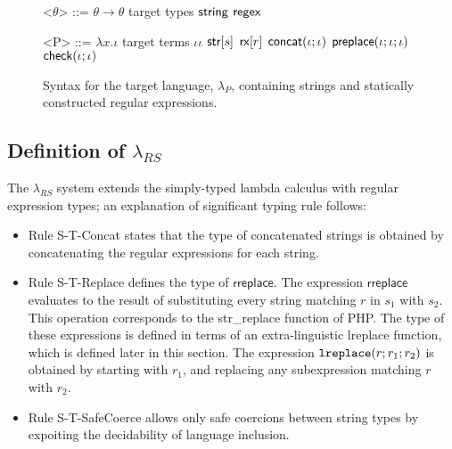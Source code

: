 \documentclass[9pt]{sig-alternate}
\theoremstyle{definition}
\newcommand{\lambdas}{\lambda_{RS}}
\newcommand{\lambdap}{\lambda_P}
\newcommand{\sisubst}[3]{{\sf rreplace}[#1](#2;#3)} \newcommand{\rreplace}[3]{{\sf rreplace}[#1](#2;#3)} %
\newcommand{\coerce}[2]{ {\sf rcoerce}[#1](#2)}
\newcommand{\sistr}[1]{{\sf rstr}[#1]}   \newcommand{\rstr}[1]{{\sf rstr}[#1]} %
\newcommand{\strin}[1]{\sistr{#1}}
\newcommand{\rsconcat}[2]{{\sf rconcat}(#1;#2)} \newcommand{\rconcat}[2]{{\sf rconcat}(#1;#2)} %
\newcommand{\stringin}[1]{{\sf stringin}[#1]}
\newcommand{\tcheck}[2]{{\sf check}(#1; #2)}
\renewcommand{\tstr}[1]{{{\sf str}[#1]}}
\newcommand{\preplace}[3]{{\sf preplace}(#1;#2;#3)}
\newcommand{\tconcat}[2]{{\sf concat}(#1;#2)} \newcommand{\concat}[2]{{\sf concat}(#1;#2)} %
\newcommand{\rx}[1]{ {\sf rx}[#1] }
\newcommand{\str}{{\sf string}}
\newcommand{\regex}{{\sf regex}}
\newcommand{\lreplace}[3]{{\tt lreplace}(#1; #2; #3)}
\begin{document}



\begin{figure}[h]
\begin{grammar}

<$\theta$> ::= $\theta \rightarrow \theta$ \hfill target types \alt
$\str$ \alt $\regex$


<P> ::= $\lambda x . \iota$ \hfill target terms \alt
  $\iota \iota$ \alt
  $\tstr{s}$ \alt
  $\rx{r}$ \alt
  $\tconcat{\iota}{\iota}$ \alt
  $\preplace{\iota}{\iota}{\iota}$ \alt
  $\tcheck{\iota}{\iota}$ 
  \end{grammar}
\caption{Syntax for the target language, $\lambdap$, containing strings and statically constructed regular expressions.}
\label{fig:lcsSyntax}
\end{figure}

\subsection{Definition of $\lambdas$}

The $\lambdas$ system extends the simply-typed lambda calculus with regular
expression types; an explanation of significant typing rule follows:
\begin{itemize}
  \item Rule S-T-Concat states that the type of concatenated strings is 
    obtained by concatenating the regular expressions for each string.
  \item Rule S-T-Replace defines the type of $\textsf{rreplace}$. The expression $\textsf{rreplace}$
    evaluates to the result of substituting every string matching $r$ in $s_1$
    with $s_2$. This operation corresponds to the \textsf{str_replace} function of PHP.
    The type of these expressions is defined in terms of an extra-linguistic \textsf{lreplace}
    function, which is defined later in this section.
    The expression $\lreplace{r}{r_1}{r_2}$ is obtained by
    starting with $r_1$, and replacing any subexpression matching $r$ with $r_2$.
  \item Rule S-T-SafeCoerce allows only safe coercions between string types by
    expoiting the decidability of language inclusion.
\end{itemize}
\end{document}
